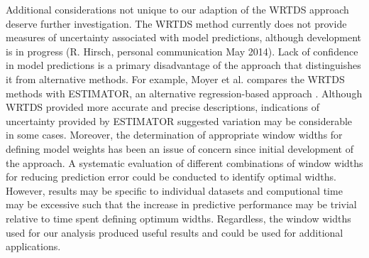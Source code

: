 \documentclass{svjour3}\usepackage[]{graphicx}\usepackage[]{color}
\begin{document}
Additional considerations not unique to our adaption of the \ac{WRTDS} approach deserve further investigation.  The \ac{WRTDS} method currently does not provide measures of uncertainty associated with model predictions, although development is in progress (R. Hirsch, personal communication May 2014). Lack of confidence in model predictions is a primary disadvantage of the approach that distinguishes it from alternative methods.  For example, Moyer et al. \cite{Moyer12} compares the \ac{WRTDS} methods with ESTIMATOR, an alternative regression-based approach \cite{Cohn92}.  Although \ac{WRTDS} provided more accurate and precise descriptions, indications of uncertainty provided by ESTIMATOR suggested variation may be considerable in some cases.  Moreover, the determination of appropriate window widths for defining model weights has been an issue of concern since initial development of the approach.  A systematic evaluation of different combinations of window widths for reducing prediction error could be conducted to identify optimal widths.  However, results may be specific to individual datasets and computional time may be excessive such that the increase in predictive performance may be trivial relative to time spent defining optimum widths.  Regardless, the window widths used for our analysis produced useful results and could be used for additional applications.
\end{document}
